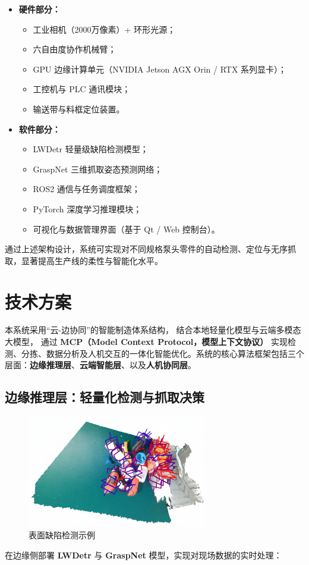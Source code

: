 \documentclass{cumcmthesis}
\begin{document}
\begin{itemize}
    \item \textbf{硬件部分：}
    \begin{itemize}
        \item 工业相机（2000万像素）+ 环形光源；
        \item 六自由度协作机械臂；
        \item GPU 边缘计算单元（NVIDIA Jetson AGX Orin / RTX 系列显卡）；
        \item 工控机与 PLC 通讯模块；
        \item 输送带与料框定位装置。
    \end{itemize}

    \item \textbf{软件部分：}
    \begin{itemize}
        \item LWDetr 轻量级缺陷检测模型；
        \item GraspNet 三维抓取姿态预测网络；
        \item ROS2 通信与任务调度框架；
        \item PyTorch 深度学习推理模块；
        \item 可视化与数据管理界面（基于 Qt / Web 控制台）。
    \end{itemize}
\end{itemize}

通过上述架构设计，系统可实现对不同规格泵头零件的自动检测、定位与无序抓取，显著提高生产线的柔性与智能化水平。


\section{技术方案}

本系统采用“云-边协同”的智能制造体系结构，
结合本地轻量化模型与云端多模态大模型，
通过 \textbf{MCP（Model Context Protocol，模型上下文协议）} 实现检测、分拣、数据分析及人机交互的一体化智能优化。系统的核心算法框架包括三个层面：\textbf{边缘推理层}、\textbf{云端智能层}、以及\textbf{人机协同层}。

\subsection{边缘推理层：轻量化检测与抓取决策}

\begin{figure}[htbp]\centering
\includegraphics[width=0.7\textwidth]{graspnet.png}
\caption{表面缺陷检测示例}\label{fig:defect_examples}
\end{figure}
在边缘侧部署 \textbf{LWDetr} 与 \textbf{GraspNet} 模型，实现对现场数据的实时处理：
\end{document}
